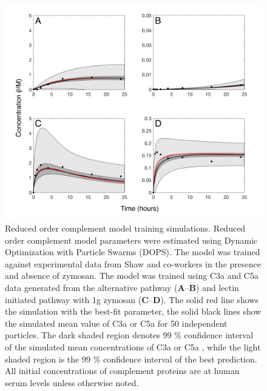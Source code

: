 \documentclass[12pt]{article}
\begin{document}
\begin{figure}[h]
\centering
\includegraphics[width=1.0\textwidth]{./figs/Figure2_Fits_final.pdf}
\caption{Reduced order complement model training simulations. Reduced order complement model parameters were estimated using Dynamic Optimization with Particle Swarms (DOPS). The model was trained against experimental data from Shaw and co-workers \cite{morad2015time} in the presence and absence of zymosan. The model was trained using C3a and C5a data generated from the alternative pathway (\textbf{A}--\textbf{B}) and lectin initiated pathway with 1g zymosan (\textbf{C}--\textbf{D}). The solid red line shows the simulation with the best-fit parameter, the solid black lines show the simulated mean value of C3a or C5a for 50 independent particles. The  dark shaded region denotes 99 \% confidence interval of the simulated mean concentrations of C3a or C5a , while the light shaded region is the 99 \% confidence interval of the best prediction. All initial concentrations of complement proteins are at human serum levels unless otherwise noted.}\label{fig-fit}
\end{figure}
\end{document}
